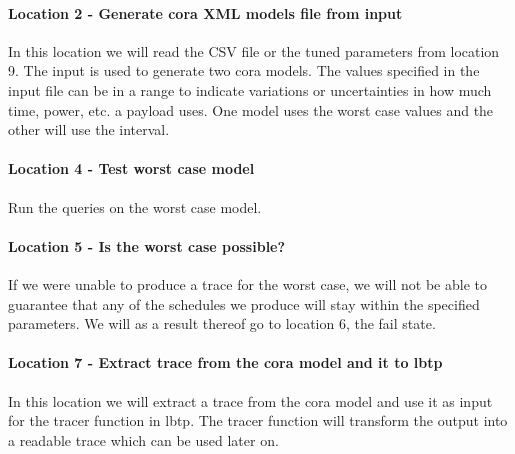 \paragraph{Location 2 - Generate \gls{cora} XML models file from input} 
In this location we will read the CSV file or the tuned parameters from location 9. 
The input is used to generate two \gls{cora} models.
The values specified in the input file can be in a range to indicate variations or uncertainties in how much time, power, etc. a payload uses.
One model uses the worst case values and the other will use the interval. 


\paragraph{Location 4 - Test worst case model} 
Run the queries on the worst case model.

\paragraph{Location 5 - Is the worst case possible?} 
If we were unable to produce a trace for the worst case, we will not be able to guarantee that any of the schedules we produce will stay within the specified parameters. 
We will as a result thereof go to location 6, the fail state.

\paragraph{Location 7 - Extract trace from the \gls{cora} model and it to \acrshort{lbtp}} 
In this location we will extract a trace from the \gls{cora} model and use it as input for the tracer function in \acrshort{lbtp}. 
The tracer function will transform the output into a readable trace which can be used later on.


